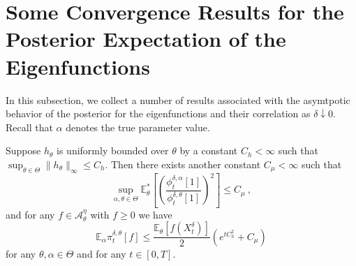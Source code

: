 \documentclass{article}
\begin{document}
\section{Some Convergence Results for the Posterior Expectation of the Eigenfunctions}\label{A:lemmasAndProps}
In this subsection, we collect a number of results associated with the asymtpotic behavior of the posterior for the eigenfunctions and their correlation as $\delta\downarrow 0$. Recall that $\alpha$ denotes the true parameter value.



\begin{lemma}
\label{L:parameterMismatch}
 Suppose $h_\theta$ is uniformly bounded over $\theta$ by a constant $C_h<\infty$ such that $\sup_{\theta\in\Theta}\|h_\theta\|_\infty\leq C_h$. Then there exists another constant $C_\mu<\infty$ such that
\[\sup_{\alpha,\theta\in\Theta}\mathbb E_\theta^*\left[\left(\frac{\phi_t^{\delta,\alpha}[1]}{\phi_t^{\delta,\theta}[1]}\right)^2\right]\leq C_\mu\ ,\]
and for any $f\in \mathcal A_\theta^\eta$ with $f\geq 0$ we have
\[\mathbb E_\alpha \pi_t^{\delta,\theta}[f]\leq  \frac{\mathbb E_\theta\left[f(X_t^\delta)\right]}{2}\left(e^{tC_h^2 }+C_\mu\right)\]
for any $\theta,\alpha\in\Theta$ and for any $t\in[0,T]$.
\end{lemma}
\end{document}
